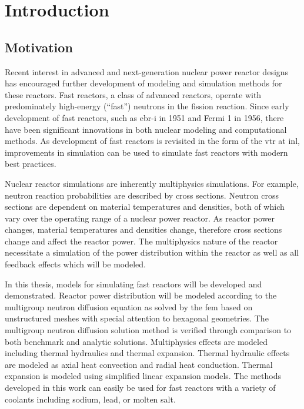 \chapter{Introduction}
\label{ch:introduction}

\section{Motivation}
  Recent interest in advanced and next-generation nuclear power reactor designs
  has encouraged further development of modeling and simulation methods for
  these reactors. Fast reactors, a class of advanced reactors, operate with
  predominately high-energy (``fast'') neutrons in the fission reaction. Since
  early development of fast reactors, such as  \gls{ebr-i} in 1951 and Fermi 1
  in 1956, there have been significant innovations in both nuclear modeling and
  computational methods. As development of fast reactors is revisited in the
  form of the \gls{vtr} at \gls{inl}, improvements in simulation can be
  used to simulate fast reactors with modern best practices. 
  

  Nuclear reactor simulations are inherently multiphysics simulations. For
  example, neutron reaction probabilities are described by cross sections.
  Neutron cross sections are dependent on material temperatures and densities,
  both of which vary over the operating range of a nuclear power reactor. As
  reactor power changes, material temperatures and densities change, therefore
  cross sections change and affect the reactor power. The multiphysics nature
  of the reactor necessitate a simulation of the power distribution within the
  reactor as well as all feedback effects which will be modeled. 
  
  In this thesis, models for simulating fast reactors will be developed and
  demonstrated. Reactor power distribution will be modeled according to the
  multigroup neutron diffusion equation as solved by the \gls{fem} based on
  unstructured meshes with special attention to hexagonal geometries.
  The multigroup neutron diffusion solution method is verified through
  comparison to both benchmark and analytic solutions. Multiphysics effects are
  modeled including thermal hydraulics and thermal expansion. Thermal hydraulic
  effects are modeled as axial heat convection and radial heat conduction.
  Thermal expansion is modeled using simplified linear expansion models. The
  methods developed in this work can easily be used for fast reactors with a
  variety of coolants including sodium, lead, or molten salt.

